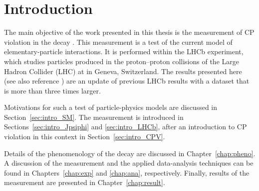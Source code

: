 \chapter{Introduction}
\label{chap:intro}

The main objective of the work presented in this thesis is the measurement of CP violation in the decay \BstoJpsiphi. This measurement is a
test of the current model of elementary-particle interactions. It is performed within the LHCb experiment, which studies particles produced
in the proton--proton collisions of the Large Hadron Collider (LHC) at \cern{} in Geneva, Switzerland. The results presented here (see also
reference \cite{LHCb-PAPER-2014}) are an update of previous LHCb results \cite{LHCb-PAPER-2013-002} with a dataset that is more than three
times larger.

Motivations for such a test of particle-physics models are discussed in Section~\ref{sec:intro_SM}. The measurement is introduced in
Sections~\ref{sec:intro_Jpsiphi} and \ref{sec:intro_LHCb}, after an introduction to CP violation in this context in
Section~\ref{sec:intro_CPV}.

Details of the phenomenology of the \BstoJpsiphi{} decay are discussed in Chapter~\ref{chap:pheno}. A discussion of the  measurement and
the applied data-analysis techniques can be found in Chapters~\ref{chap:exp} and \ref{chap:ana}, respectively. Finally, results of the
measurement are presented in Chapter~\ref{chap:result}.





